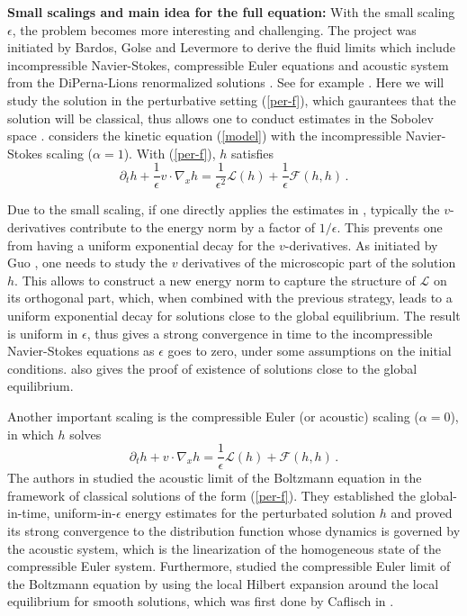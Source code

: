 \documentclass[final,onefignum,onetabnum]{siamart171218}
\newcounter{example}
\begin{document}
{\bf Small scalings and main idea for the full equation: }
With the small scaling $\epsilon$, the problem becomes more interesting and challenging.
The project was initiated by Bardos, Golse and Levermore \cite{Bardos1, Bardos2} to derive the fluid limits which include incompressible
Navier-Stokes, compressible Euler equations and acoustic system from the DiPerna-Lions renormalized solutions \cite{Lions}.
See for example \cite{GSR, LevMas}. Here we will study the solution
in the perturbative setting (\ref{per-f}), which gaurantees that the solution
will be classical, thus allows one to conduct estimates in the Sobolev space
\cite{Guo-NS}.
\cite{MB} considers the kinetic  equation (\ref{model}) with the incompressible Navier-Stokes scaling ($\alpha=1$). With (\ref{per-f}),  $h$ satisfies
\begin{equation}\partial_t h + \frac{1}{\epsilon}v\cdot\nabla_x h=\frac{1}{\epsilon^2}\mathcal L(h)+\frac{1}{\epsilon}\mathcal F(h,h)\,. 
  \label{INS-scaling}
\end{equation}

Due to the small scaling, if one directly applies the estimates in \cite{CN}, typically the $v$-derivatives contribute to the energy norm by
a factor of $1/\epsilon$.
This prevents one from having a uniform exponential decay for the $v$-derivatives.
As initiated by Guo \cite{Guo-NS}, one needs to study the $v$ derivatives of the microscopic part of
the solution $h$. This allows \cite{MB} to construct a new energy norm to capture the structure of $\mathcal L$ on its orthogonal part, which, when combined with the previous
strategy, leads to a uniform exponential decay for solutions close to the global equilibrium.
The result is uniform in $\epsilon$, thus gives a strong convergence in time to the incompressible Navier-Stokes equations as $\epsilon$ goes to zero,
under some assumptions on the initial conditions.
\cite{MB} also gives the proof of existence of solutions close to the global equilibrium.

Another important scaling is the compressible Euler (or acoustic) scaling
($\alpha=0$), in which $h$ solves
\begin{equation}
  \label{Euler-scaling}
  \partial_t h + v\cdot\nabla_x h=\frac{1}{\epsilon}\mathcal L(h)+\mathcal F(h,h)\,. 
  \end{equation}
The authors in \cite{Jang09, LevMas, Levermore, Jang-Guo1,AMUXY} studied the acoustic limit of the Boltzmann equation in the framework of classical solutions of the form (\ref{per-f}).
They established the global-in-time,
uniform-in-$\epsilon$ energy estimates for the perturbated solution $h$ and proved its strong convergence to the distribution function whose dynamics
is governed by the acoustic system, which is the linearization of the homogeneous state of the compressible Euler system.
Furthermore, \cite{Jang-Guo2} studied the compressible Euler limit of the Boltzmann equation by using the local Hilbert expansion around the local
equilibrium for smooth solutions, which was first done by Caflisch in \cite{Caflisch}.
\end{document}
